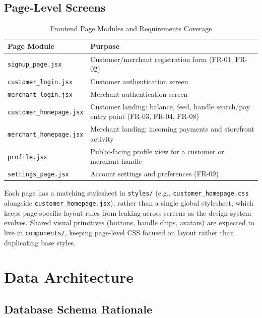 \documentclass[12pt, a4paper, twoside, openright]{report}
\begin{document}
\subsection{Page-Level Screens}

\begin{table}[H]
    \centering
    \begin{tabularx}{\textwidth}{|l|X|}
    \hline
    \textbf{Page Module} & \textbf{Purpose} \\
    \hline
    \texttt{signup\_page.jsx} & Customer/merchant registration form (FR-01, FR-02) \\
    \hline
    \texttt{customer\_login.jsx} & Customer authentication screen \\
    \hline
    \texttt{merchant\_login.jsx} & Merchant authentication screen \\
    \hline
    \texttt{customer\_homepage.jsx} & Customer landing: balance, feed, handle search/pay entry point (FR-03, FR-04, FR-08) \\
    \hline
    \texttt{merchant\_homepage.jsx} & Merchant landing: incoming payments and storefront activity \\
    \hline
    \texttt{profile.jsx} & Public-facing profile view for a customer or merchant handle \\
    \hline
    \texttt{settings\_page.jsx} & Account settings and preferences (FR-09) \\
    \hline
    \end{tabularx}
    \caption{Frontend Page Modules and Requirements Coverage}
\end{table}

Each page has a matching stylesheet in \texttt{styles/} (e.g., \texttt{customer\_homepage.css} alongside \texttt{customer\_homepage.jsx}), rather than a single global stylesheet, which keeps page-specific layout rules from leaking across screens as the design system evolves. Shared visual primitives (buttons, handle chips, avatars) are expected to live in \texttt{components/}, keeping page-level CSS focused on layout rather than duplicating base styles.

\section{Data Architecture}

\subsection{Database Schema Rationale}
\end{document}
